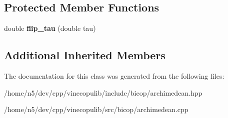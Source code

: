 \subsection*{Protected Member Functions}
\begin{DoxyCompactItemize}
\item 
double {\bfseries flip\+\_\+tau} (double tau)\hypertarget{classvinecopulib_1_1_archimedean_bicop_a7ded3792cb1eebe53e97076f2e681137}{}\label{classvinecopulib_1_1_archimedean_bicop_a7ded3792cb1eebe53e97076f2e681137}

\end{DoxyCompactItemize}
\subsection*{Additional Inherited Members}


The documentation for this class was generated from the following files\+:\begin{DoxyCompactItemize}
\item 
/home/n5/dev/cpp/vinecopulib/include/bicop/archimedean.\+hpp\item 
/home/n5/dev/cpp/vinecopulib/src/bicop/archimedean.\+cpp\end{DoxyCompactItemize}
